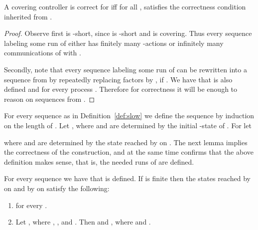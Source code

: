 \documentclass[10pt,a4paper]{article}
\begin{document}
\begin{lemma}\label{lemma:reduciton-to-slow}
 A covering controller  is correct for  iff
  for all ,  satisfies the correctness condition
  inherited from .
\end{lemma}

\begin{proof}
  Observe first  is
  -short, since  is -short and  is covering. Thus
  every sequence labeling some run of   either has
  finitely many -actions or infinitely many communications of 
  with .  

  Secondly, note that every sequence  labeling
  some run of  can be rewritten into a sequence  from
   by repeatedly replacing factors  by , if
  . We have that  is also
  defined and  for every
  process . Therefore for
  correctness it will be enough to reason on sequences from
  .
\end{proof}


For every sequence  as in Definition~\ref{def:slow} we
define the sequence  by induction on the
length of . Let , where  and 
are determined by
    the initial -state of .  For  let

where  and  are determined by the state reached by  on
.   The next lemma
implies the correctness of the construction, and at the same time
confirms that the above definition makes sense, that is, the needed
runs of  are defined.









\begin{lemma}\label{lemma:D invariant}
  For every sequence  we have that
   is defined. If  is finite then the states
  reached by  on  and by  on  satisfy the following:
  \begin{enumerate}
  \item  for every
  .
\item Let , where , , and . Then  and , where
   and
  .
  \end{enumerate}
\end{lemma}
\end{document}
